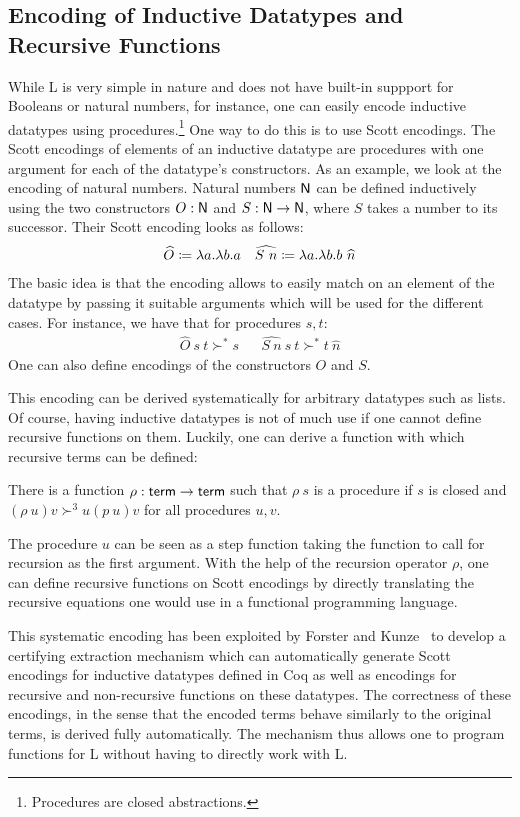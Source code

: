 \subsection{Encoding of Inductive Datatypes and Recursive Functions}
While L is very simple in nature and does not have built-in suppport for Booleans or natural numbers, for instance, one can easily encode inductive datatypes using procedures.\footnote{Procedures are closed abstractions.} One way to do this is to use Scott encodings. 
The Scott encodings of elements of an inductive datatype are procedures with one argument for each of the datatype's constructors. 
As an example, we look at the encoding of natural numbers. Natural numbers $\mathsf{N}$ can be defined inductively using the two constructors $O : \mathsf{N}$ and $S : \mathsf{N} \rightarrow \mathsf{N}$, where $S$ takes a number to its successor. 
Their Scott encoding looks as follows: 
\begin{align*}
  \widehat{O} \coloneqq \lambda a. \lambda b. a 
  && \widehat{S~n} \coloneqq \lambda a. \lambda b. b~\widehat{n}
\end{align*}
The basic idea is that the encoding allows to easily match on an element of the datatype by passing it suitable arguments which will be used for the different cases. 
For instance, we have that for procedures $s, t$: 
\begin{align*}
  \widehat{O}~s~t \succ^* s && \widehat{S~n}~s~t \succ^* t~\widehat{n} 
\end{align*}
One can also define encodings of the constructors $O$ and $S$. 

This encoding can be derived systematically for arbitrary datatypes such as lists. 
Of course, having inductive datatypes is not of much use if one cannot define recursive functions on them. 
Luckily, one can derive a function with which recursive terms can be defined: 
\begin{fact}
  There is a function $\rho : \textsf{term} \rightarrow \textsf{term}$ such that $\rho~s$ is a procedure if $s$ is closed and $(\rho~u)v \succ^3 u(p~u)v$ for all procedures $u, v$.
\end{fact}
The procedure $u$ can be seen as a step function taking the function to call for recursion as the first argument. 
With the help of the recursion operator $\rho$, one can define recursive functions on Scott encodings by directly translating the recursive equations one would use in a functional programming language.

This systematic encoding has been exploited by Forster and Kunze~\cite{ForsterKunze:2019:Certifying-extraction} to develop a certifying extraction mechanism which can automatically generate Scott encodings for inductive datatypes defined in Coq as well as encodings for recursive and non-recursive functions on these datatypes. The correctness of these encodings, in the sense that the encoded terms behave similarly to the original terms, is derived fully automatically.
The mechanism thus allows one to program functions for L without having to directly work with L.

